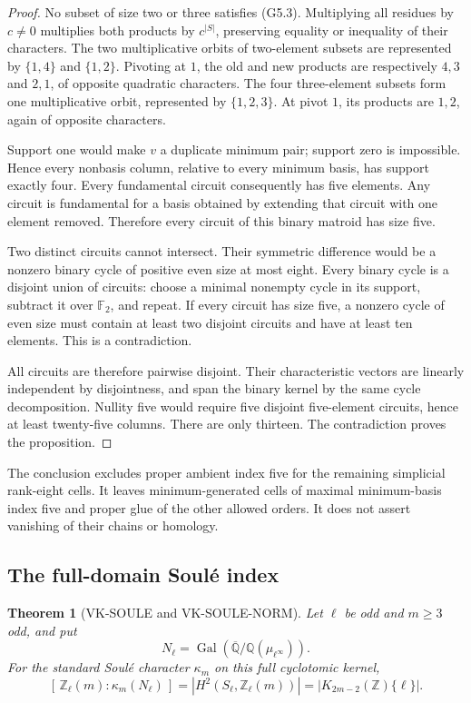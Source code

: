 \documentclass[11pt,a4paper]{article}
\newtheorem{theorem}{Theorem}[section]
\theoremstyle{definition}
\begin{document}
\begin{proof}
No subset of size two or three satisfies (G5.3).
Multiplying all residues by \(c\ne0\) multiplies both
products by \(c^{|S|}\), preserving equality or inequality
of their characters.  The two multiplicative orbits of
two-element subsets are represented by \(\{1,4\}\) and
\(\{1,2\}\).  Pivoting at \(1\), the old and new products
are respectively \(4,3\) and \(2,1\), of opposite quadratic
characters.  The four three-element subsets form one
multiplicative orbit, represented by \(\{1,2,3\}\).
At pivot \(1\), its products are \(1,2\), again of opposite
characters.

Support one would make \(v\) a duplicate minimum pair;
support zero is impossible.  Hence every nonbasis column,
relative to every minimum basis, has support exactly four.
Every fundamental circuit consequently has five elements.
Any circuit is fundamental for a basis obtained by extending
that circuit with one element removed.  Therefore every
circuit of this binary matroid has size five.

Two distinct circuits cannot intersect.  Their symmetric
difference would be a nonzero binary cycle of positive even
size at most eight.  Every binary cycle is a disjoint union
of circuits: choose a minimal nonempty cycle in its support,
subtract it over \(\mathbb F_2\), and repeat.
If every circuit has size five, a nonzero cycle of even size
must contain at least two disjoint circuits and have at
least ten elements.  This is a contradiction.

All circuits are therefore pairwise disjoint.  Their
characteristic vectors are linearly independent by
disjointness, and span the binary kernel by the same
cycle decomposition.  Nullity five would require five
disjoint five-element circuits, hence at least twenty-five
columns.  There are only thirteen.  The contradiction
proves the proposition.
\end{proof}

The conclusion excludes proper ambient index five for the
remaining simplicial rank-eight cells.  It leaves
minimum-generated cells of maximal minimum-basis index five
and proper glue of the other allowed orders.  It does not
assert vanishing of their chains or homology.

\subsection{The full-domain Soul\'e index}

\begin{theorem}[VK-SOULE and VK-SOULE-NORM]
Let \(\ell\) be odd and \(m\ge3\) odd, and put
\[
 N_\ell=\operatorname{Gal}
   (\overline{\mathbb Q}/\mathbb Q(\mu_{\ell^\infty})).
\]
For the standard Soul\'e character \(\kappa_m\) on this
full cyclotomic kernel,
\[
 [\,\mathbb Z_\ell(m):\kappa_m(N_\ell)\,]
   =|H^2(S_\ell,\mathbb Z_\ell(m))|
   =|K_{2m-2}(\mathbb Z)\{\ell\}|.                   \tag{K18}
\]
\end{theorem}
\end{document}
